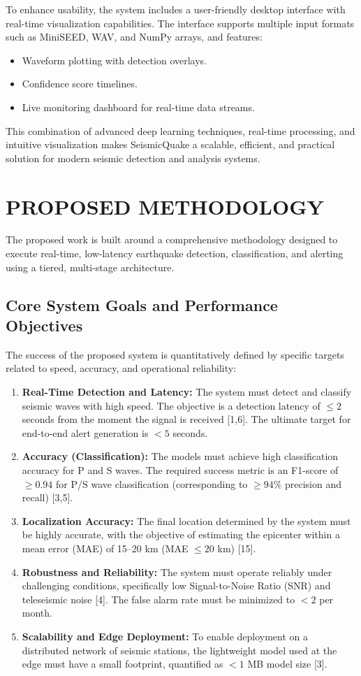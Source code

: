 \documentclass[a4paper,12pt]{report}
\begin{document}
To enhance usability, the system includes a user-friendly desktop interface with real-time visualization capabilities. The interface supports multiple input formats such as MiniSEED, WAV, and NumPy arrays, and features:
\begin{itemize}
\item Waveform plotting with detection overlays.
\item Confidence score timelines.
\item Live monitoring dashboard for real-time data streams.
\end{itemize}

This combination of advanced deep learning techniques, real-time processing, and intuitive visualization makes SeismicQuake a scalable, efficient, and practical solution for modern seismic detection and analysis systems.

\section{PROPOSED METHODOLOGY}
\label{sec:proposed_methodology}

The proposed work is built around a comprehensive methodology designed to execute real-time, low-latency earthquake detection, classification, and alerting using a tiered, multi-stage architecture.

\subsection{Core System Goals and Performance Objectives}
\label{ssec:core_goals}

The success of the proposed system is quantitatively defined by specific targets related to speed, accuracy, and operational reliability:
\begin{enumerate}
\item \textbf{Real-Time Detection and Latency:} The system must detect and classify seismic waves with high speed. The objective is a detection latency of $\leq 2$ seconds from the moment the signal is received [1,6]. The ultimate target for end-to-end alert generation is $< 5$ seconds.
\item \textbf{Accuracy (Classification):} The models must achieve high classification accuracy for P and S waves. The required success metric is an F1-score of $\geq 0.94$ for P/S wave classification (corresponding to $\geq 94\%$ precision and recall) [3,5].
\item \textbf{Localization Accuracy:} The final location determined by the system must be highly accurate, with the objective of estimating the epicenter within a mean error (MAE) of 15--20 km (MAE $\leq 20$ km) [15].
\item \textbf{Robustness and Reliability:} The system must operate reliably under challenging conditions, specifically low Signal-to-Noise Ratio (SNR) and teleseismic noise [4]. The false alarm rate must be minimized to $< 2$ per month.
\item \textbf{Scalability and Edge Deployment:} To enable deployment on a distributed network of seismic stations, the lightweight model used at the edge must have a small footprint, quantified as $< 1$ MB model size [3].
\end{enumerate}
\end{document}
